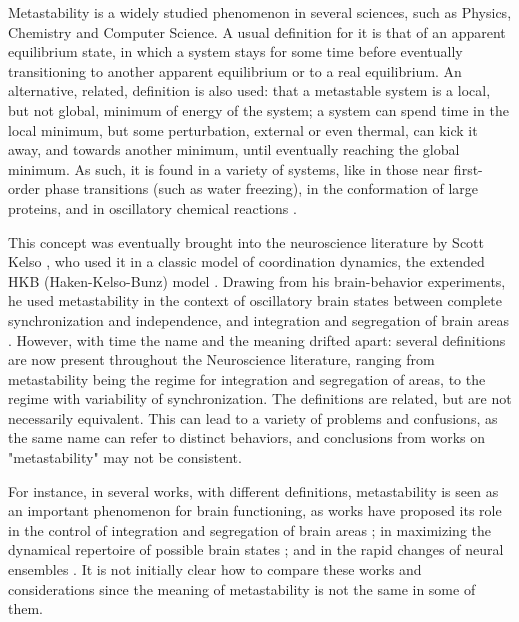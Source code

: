 \documentclass[preprint,superscriptaddress,showpacs,amsmath,amssymb,aps,pre,floatfix]{revtex4-1}
\theoremstyle{definition}
\begin{document}
Metastability is a widely studied phenomenon in several sciences, such as Physics, Chemistry and Computer Science. A usual definition for it is that of an apparent equilibrium state, in which a system stays for some time before eventually transitioning to another apparent equilibrium or to a real equilibrium. An alternative, related, definition is also used: that a metastable system is a local, but not global, minimum of energy of the system; a system can spend time in the local minimum, but some perturbation, external or even thermal, can kick it away, and towards another minimum, until eventually reaching the global minimum. As such, it is found in a variety of systems, like in those near first-order phase transitions (such as water freezing), in the conformation of large proteins, and in oscillatory chemical reactions \cite{bovier_2009}.  

This concept was eventually brought into the neuroscience literature by Scott Kelso \cite{fingelkurts_2008, fingelkurts_2017, deco_2017}, who used it in a classic model of coordination dynamics, the extended HKB (Haken-Kelso-Bunz) model \cite{kelso_1995, kelso_1995book}. Drawing from his brain-behavior experiments, he used metastability in the context of oscillatory brain states between complete synchronization and independence, and integration and segregation of brain areas \cite{deco_2017, kelso_1995book, tognoli_2014, kelso_2017}. 
However, with time the name and the meaning drifted apart: several definitions are now present throughout the Neuroscience literature, ranging from metastability being the regime for integration and segregation of areas, to the regime with variability of synchronization. The definitions are related, but are not necessarily equivalent. 
This can lead to a variety of problems and confusions, as the same name can refer to distinct behaviors, and conclusions from works on "metastability" may not be consistent.

For instance, in several works, with different definitions, metastability is seen as an important phenomenon for brain functioning, as works have proposed its role in the control of integration and segregation of brain areas \cite{tognoli_2014, fingelkurts_2004, alderson_2018}; in maximizing the dynamical repertoire of possible brain states \cite{ponce-alvarez_2015, alderson_2020, hellyer_2014, cordova-palomera_2017}; and in the rapid changes of neural ensembles \cite{shanahan_2010, kahana_2006}. It is not initially clear how to compare these works and considerations since the meaning of metastability is not the same in some of them.
\end{document}
